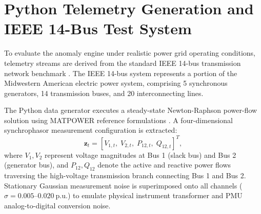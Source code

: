 \documentclass[11pt,a4paper]{report}
\begin{document}
\section{Python Telemetry Generation and IEEE 14-Bus Test System}
To evaluate the anomaly engine under realistic power grid operating conditions, telemetry
streams are derived from the standard IEEE 14-bus transmission network benchmark \cite{matpowercase14}.
The IEEE 14-bus system represents a portion of the Midwestern American electric power system,
comprising 5 synchronous generators, 14 transmission buses, and 20 interconnecting lines.

The Python data generator executes a steady-state Newton-Raphson power-flow solution using
MATPOWER reference formulations \cite{zimmerman2011,matpowercase14}. A four-dimensional synchrophasor measurement configuration
is extracted:
\begin{equation}
\boldsymbol{z}_t = [V_{1,t}, \; V_{2,t}, \; P_{12,t}, \; Q_{12,t}]^T,
\end{equation}
where $V_1, V_2$ represent voltage magnitudes at Bus 1 (slack bus) and Bus 2 (generator bus),
and $P_{12}, Q_{12}$ denote the active and reactive power flows traversing the high-voltage
transmission branch connecting Bus 1 and Bus 2. Stationary Gaussian measurement noise is
superimposed onto all channels ($\sigma = 0.005\text{--}0.020~\text{p.u.}$) to emulate physical
instrument transformer and PMU analog-to-digital conversion noise.
\end{document}
